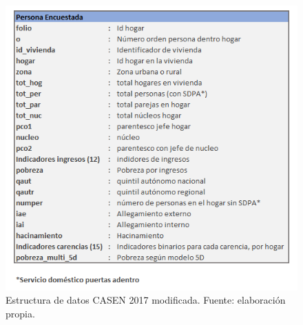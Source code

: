 \documentclass[12pt,letterpaper,spanish]{article}
\begin{document}
\begin{figure} [H]
        \centering
        \includegraphics{estructura.png}
        \caption{Estructura de datos CASEN 2017 modificada. Fuente: elaboración propia.}
        \label{estructura}
    \end{figure}

\newpage
\end{document}
